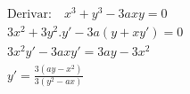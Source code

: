 \begin{ex}
\begin{align}
&\text{Derivar:} \quad x^3+y^3-3axy=0\nonumber\\
&3x^2+3y^2.y'-3a(y+xy')=0\nonumber\\
&3x^2y'-3axy'=3ay-3x^2\nonumber\\
&y'=\frac{3(ay-x^2)}{3(y^2-ax)}\nonumber
\end{align}
\end{ex}

